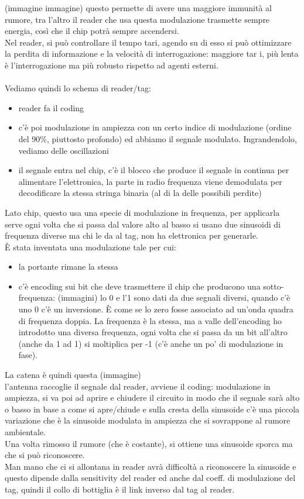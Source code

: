 \documentclass[oneside, 12pt]{extbook}
\begin{document}
(immagine immagine)
questo permette di avere una maggiore immunità al rumore, tra l'altro il reader che usa questa modulazione trasmette sempre energia, così che il chip potrà sempre accendersi.\\Nel reader, si può controllare il tempo tari, agendo su di esso si può ottimizzare la perdita di informazione e la velocità di interrogazione: maggiore tar i, più lenta è l'interrogazione ma più robusto rispetto ad agenti esterni.
\\\\Vediamo quindi lo schema di reader/tag:
\begin{itemize}
	\item reader fa il coding
	\item c'è poi modulazione in ampiezza con un certo indice di modulazione (ordine del 90\%, piuttosto profondo) ed abbiamo il segnale modulato. Ingrandendolo, vediamo delle oscillazioni
	\item il segnale entra nel chip, c'è il blocco che produce il segnale in continua per alimentare l'elettronica, la parte in radio frequenza viene demodulata per decodificare la stessa stringa binaria (al di la delle possibili perdite)
\end{itemize}
Lato chip, questo usa una specie di modulazione in frequenza, per applicarla serve ogni volta che si passa dal valore alto al basso si usano due sinusoidi di frequenza diverse ma chi le da al tag, non ha elettronica per generarle.\\È stata inventata una modulazione tale per cui:
\begin{itemize}
	\item la portante rimane la stessa
	\item c'è encoding sui bit che deve trasmettere il chip che producono una sotto-frequenza: (immagini) lo 0 e l'1 sono dati da due segnali diversi, quando c'è uno 0 c'è un inversione. È come se lo zero fosse associato ad un'onda quadra di frequenza doppia. La frequenza è la stessa, ma a valle dell'encoding ho introdotto una diversa frequenza, ogni volta che si passa da un bit all'altro (anche da 1 ad 1) si moltiplica per -1 (c'è anche un po' di modulazione in fase).
\end{itemize}
La catena è quindi questa (immagine)\\
l'antenna raccoglie il segnale dal reader, avviene il coding: modulazione in ampiezza, si va poi ad aprire e chiudere il circuito in modo che il segnale sarà alto o basso in base a come si apre/chiude e sulla cresta della sinusoide c'è una piccola variazione che è la sinusoide modulata in ampiezza che si sovrappone al rumore ambientale.\\Una volta rimosso il rumore (che è costante), si ottiene una sinusoide sporca ma che si può riconoscere.\\Man mano che ci si allontana in reader avrà difficoltà a riconoscere la sinusoide e questo dipende dalla sensitivity del reader ed anche dal coeff. di modulazione del tag, quindi il collo di bottiglia è il link inverso dal tag al reader.
\end{document}
